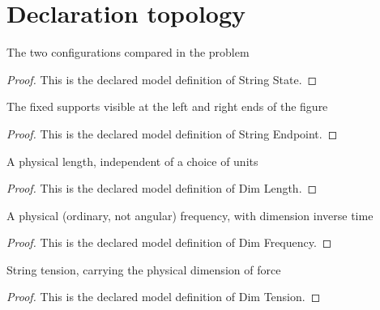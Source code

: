 \section{Declaration topology}
\begin{definition}
  \label{def:physics:phyx-mini-0178:phyxminiproblems-problemphyxmini0178-stringstate}
  The two configurations compared in the problem
\end{definition}
\begin{proof}
  This is the declared model definition of String State.
\end{proof}
\begin{definition}
  \label{def:physics:phyx-mini-0178:phyxminiproblems-problemphyxmini0178-stringendpoint}
  The fixed supports visible at the left and right ends of the figure
\end{definition}
\begin{proof}
  This is the declared model definition of String Endpoint.
\end{proof}
\begin{definition}
  \label{def:physics:phyx-mini-0178:phyxminiproblems-problemphyxmini0178-dimlength}
  A physical length, independent of a choice of units
\end{definition}
\begin{proof}
  This is the declared model definition of Dim Length.
\end{proof}
\begin{definition}
  \label{def:physics:phyx-mini-0178:phyxminiproblems-problemphyxmini0178-dimfrequency}
  A physical (ordinary, not angular) frequency, with dimension inverse time
\end{definition}
\begin{proof}
  This is the declared model definition of Dim Frequency.
\end{proof}
\begin{definition}
  \label{def:physics:phyx-mini-0178:phyxminiproblems-problemphyxmini0178-dimtension}
  String tension, carrying the physical dimension of force
\end{definition}
\begin{proof}
  This is the declared model definition of Dim Tension.
\end{proof}

